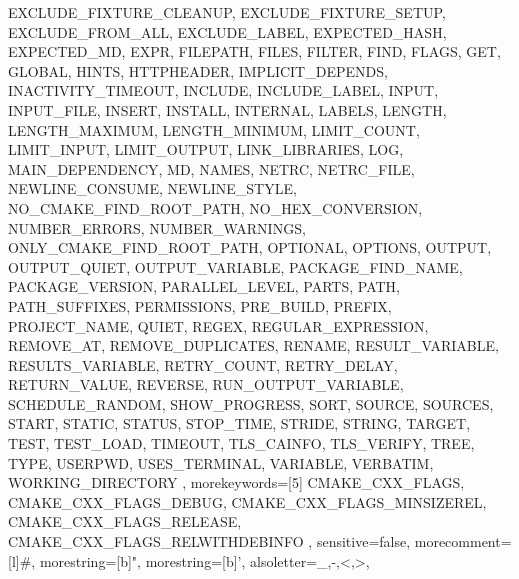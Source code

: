 {{      EXCLUDE_FIXTURE_CLEANUP, EXCLUDE_FIXTURE_SETUP, EXCLUDE_FROM_ALL,
      EXCLUDE_LABEL, EXPECTED_HASH, EXPECTED_MD, EXPR, FILEPATH, FILES,
      FILTER, FIND, FLAGS, GET, GLOBAL, HINTS, HTTPHEADER,
      IMPLICIT_DEPENDS, INACTIVITY_TIMEOUT, INCLUDE, INCLUDE_LABEL, INPUT,
      INPUT_FILE, INSERT, INSTALL, INTERNAL, LABELS, LENGTH,
      LENGTH_MAXIMUM, LENGTH_MINIMUM, LIMIT_COUNT, LIMIT_INPUT,
      LIMIT_OUTPUT, LINK_LIBRARIES, LOG, MAIN_DEPENDENCY, MD, NAMES, NETRC,
      NETRC_FILE, NEWLINE_CONSUME, NEWLINE_STYLE, NO_CMAKE_FIND_ROOT_PATH,
      NO_HEX_CONVERSION, NUMBER_ERRORS, NUMBER_WARNINGS,
      ONLY_CMAKE_FIND_ROOT_PATH, OPTIONAL, OPTIONS, OUTPUT, OUTPUT_QUIET,
      OUTPUT_VARIABLE, PACKAGE_FIND_NAME, PACKAGE_VERSION, PARALLEL_LEVEL,
      PARTS, PATH, PATH_SUFFIXES, PERMISSIONS, PRE_BUILD, PREFIX,
      PROJECT_NAME, QUIET, REGEX, REGULAR_EXPRESSION, REMOVE_AT,
      REMOVE_DUPLICATES, RENAME, RESULT_VARIABLE, RESULTS_VARIABLE,
      RETRY_COUNT, RETRY_DELAY, RETURN_VALUE, REVERSE, RUN_OUTPUT_VARIABLE,
      SCHEDULE_RANDOM, SHOW_PROGRESS, SORT, SOURCE, SOURCES, START, STATIC,
      STATUS, STOP_TIME, STRIDE, STRING, TARGET, TEST, TEST_LOAD, TIMEOUT,
      TLS_CAINFO, TLS_VERIFY, TREE, TYPE, USERPWD, USES_TERMINAL, VARIABLE,
      VERBATIM, WORKING_DIRECTORY },
    morekeywords=[5]{ CMAKE_CXX_FLAGS, CMAKE_CXX_FLAGS_DEBUG,
      CMAKE_CXX_FLAGS_MINSIZEREL, CMAKE_CXX_FLAGS_RELEASE,
      CMAKE_CXX_FLAGS_RELWITHDEBINFO },
    sensitive=false,
    morecomment=[l]\#,
    morestring=[b]",
    morestring=[b]',
    alsoletter={_,-,<,>},
}
